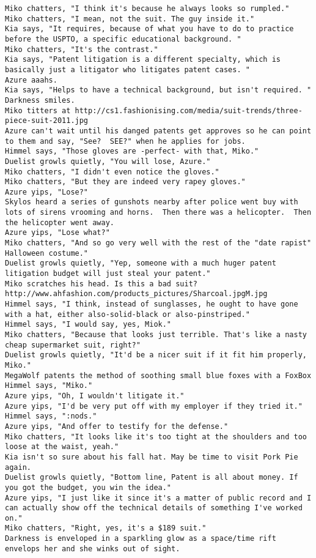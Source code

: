 \begin{verbatim}
Miko chatters, "I think it's because he always looks so rumpled."
Miko chatters, "I mean, not the suit. The guy inside it."
Kia says, "It requires, because of what you have to do to practice before the USPTO, a specific educational background. "
Miko chatters, "It's the contrast."
Kia says, "Patent litigation is a different specialty, which is basically just a litigator who litigates patent cases. "
Azure aaahs.
Kia says, "Helps to have a technical background, but isn't required. "
Darkness smiles.
Miko titters at http://cs1.fashionising.com/media/suit-trends/three-piece-suit-2011.jpg
Azure can't wait until his danged patents get approves so he can point to them and say, "See?  SEE?" when he applies for jobs.
Himmel says, "Those gloves are -perfect- with that, Miko."
Duelist growls quietly, "You will lose, Azure."
Miko chatters, "I didn't even notice the gloves."
Miko chatters, "But they are indeed very rapey gloves."
Azure yips, "Lose?"
Skylos heard a series of gunshots nearby after police went buy with lots of sirens vrooming and horns.  Then there was a helicopter.  Then the helicopter went away.
Azure yips, "Lose what?"
Miko chatters, "And so go very well with the rest of the "date rapist" Halloween costume."
Duelist growls quietly, "Yep, someone with a much huger patent litigation budget will just steal your patent."
Miko scratches his head. Is this a bad suit? http://www.ahfashion.com/products_pictures/Sharcoal.jpgM.jpg
Himmel says, "I think, instead of sunglasses, he ought to have gone with a hat, either also-solid-black or also-pinstriped."
Himmel says, "I would say, yes, Miok."
Miko chatters, "Because that looks just terrible. That's like a nasty cheap supermarket suit, right?"
Duelist growls quietly, "It'd be a nicer suit if it fit him properly, Miko."
MegaWolf patents the method of soothing small blue foxes with a FoxBox
Himmel says, "Miko."
Azure yips, "Oh, I wouldn't litigate it."
Azure yips, "I'd be very put off with my employer if they tried it."
Himmel says, ":nods."
Azure yips, "And offer to testify for the defense."
Miko chatters, "It looks like it's too tight at the shoulders and too loose at the waist, yeah."
Kia isn't so sure about his fall hat. May be time to visit Pork Pie again.
Duelist growls quietly, "Bottom line, Patent is all about money. If you got the budget, you win the idea."
Azure yips, "I just like it since it's a matter of public record and I can actually show off the technical details of something I've worked on."
Miko chatters, "Right, yes, it's a $189 suit."
Darkness is enveloped in a sparkling glow as a space/time rift envelops her and she winks out of sight.

\end{verbatim}
